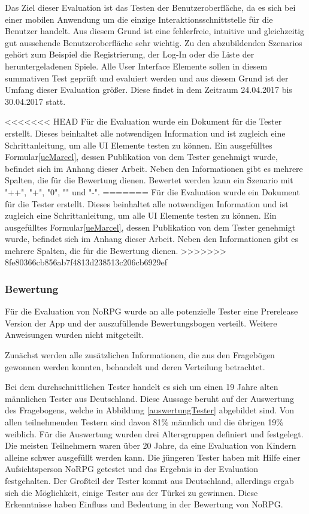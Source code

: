 			Das Ziel dieser Evaluation ist das Testen der Benutzeroberfläche, da es sich bei einer mobilen Anwendung um die einzige Interaktionsschnittstelle für die Benutzer handelt. Aus diesem Grund ist eine fehlerfreie, intuitive und gleichzeitig gut aussehende Benutzeroberfläche sehr wichtig. Zu den abzubildenden Szenarios gehört zum Beispiel die Registrierung, der Log-In oder die Liste der heruntergeladenen Spiele. Alle User Interface Elemente sollen in diesem summativen Test geprüft und evaluiert werden und aus diesem Grund ist der Umfang dieser Evaluation größer. Diese findet in dem Zeitraum 24.04.2017 bis 30.04.2017 statt.
		
<<<<<<< HEAD
			Für die Evaluation wurde ein Dokument für die Tester erstellt. Dieses beinhaltet alle notwendigen Information und ist zugleich eine Schrittanleitung, um alle UI Elemente testen zu können. Ein ausgefülltes Formular\ref{ueMarcel}, dessen Publikation von dem Tester genehmigt wurde, befindet sich im Anhang dieser Arbeit. Neben den Informationen gibt es mehrere Spalten, die für die Bewertung dienen. Bewertet werden kann ein Szenario mit "++", "+", "0", "\-" und "\--". 
=======
			Für die Evaluation wurde ein Dokument für die Tester erstellt. Dieses beinhaltet alle notwendigen Information und ist zugleich eine Schrittanleitung, um alle UI Elemente testen zu können. Ein ausgefülltes Formular\ref{ueMarcel}, dessen Publikation von dem Tester genehmigt wurde, befindet sich im Anhang dieser Arbeit. Neben den Informationen gibt es mehrere Spalten, die für die Bewertung dienen. 
>>>>>>> 8fe80366cb856ab7f4813d238513c206cb6929ef
		
		\subsubsection{Bewertung}
			Für die Evaluation von NoRPG wurde an alle potenzielle Tester eine Prerelease Version der App und der auszufüllende Bewertungsbogen verteilt. Weitere Anweisungen wurden nicht mitgeteilt.
			
			Zunächst werden alle zusätzlichen Informationen, die aus den Fragebögen gewonnen werden konnten, behandelt und deren Verteilung betrachtet.
			
			Bei dem durchschnittlichen Tester handelt es sich um einen 19 Jahre alten männlichen Tester aus Deutschland. Diese Aussage beruht auf der Auswertung des Fragebogens, welche in Abbildung \ref{auswertungTester} abgebildet sind. Von allen teilnehmenden Testern sind davon 81\% männlich und die übrigen 19\% weiblich. Für die Auswertung wurden drei Altersgruppen definiert und festgelegt. Die meisten Teilnehmern waren über 20 Jahre, da eine Evaluation von Kindern alleine schwer ausgefüllt werden kann. Die jüngeren Tester haben mit Hilfe einer Aufsichtsperson NoRPG getestet und das Ergebnis in der Evaluation festgehalten. Der Großteil der Tester kommt aus Deutschland, allerdings ergab sich die Möglichkeit, einige Tester aus der Türkei zu gewinnen. Diese Erkenntnisse haben Einfluss und Bedeutung in der Bewertung von NoRPG.
			
